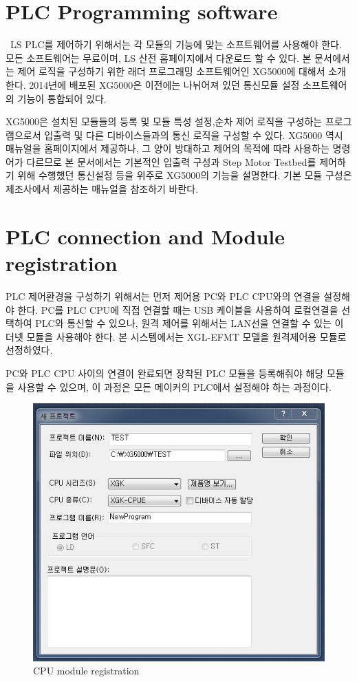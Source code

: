 \documentclass[11pt
  , a4paper
  , article
  , oneside
]{memoir}
\begin{document}
\newpage

 \section{PLC Programming software}\
LS PLC를 제어하기 위해서는 각 모듈의 기능에 맞는 소프트웨어를 사용해야 한다. 모든 소프트웨어는 무료이며, LS 산전 홈페이지에서 다운로드 할 수 있다. 본 문서에서는 제어 로직을 구성하기 위한 래더 프로그래밍 소프트웨어인 XG5000에 대해서 소개한다. 2014년에 배포된 XG5000은 이전에는 나뉘어져 있던 통신모듈 설정 소프트웨어의 기능이 통합되어 있다.  

XG5000은 설치된 모듈들의 등록 및 모듈 특성 설정,순차 제어 로직을 구성하는 프로그램으로서 입출력 및 다른 디바이스들과의 통신 로직을 구성할 수 있다. XG5000 역시 매뉴얼을 홈페이지에서 제공하나, 그 양이 방대하고 제어의 목적에 따라 사용하는 명령어가 다르므로 본 문서에서는 기본적인 입출력 구성과 Step Motor Testbed를 제어하기 위해 수행했던 통신설정 등을 위주로 XG5000의 기능을 설명한다. 기본 모듈 구성은 제조사에서 제공하는 매뉴얼을 참조하기 바란다. 
  
  \section{PLC connection and Module registration}
 PLC 제어환경을 구성하기 위해서는 먼저 제어용 PC와 PLC CPU와의 연결을 설정해야 한다. PC를 PLC CPU에 직접 연결할 때는 USB 케이블을 사용하여 로컬연결을 선택하여 PLC와 통신할 수 있으나, 원격 제어를 위해서는 LAN선을 연결할 수 있는 이더넷 모듈을 사용해야 한다. 본 시스템에서는 XGL-EFMT 모델을 원격제어용 모듈로 선정하였다.\
 
 PC와 PLC CPU 사이의 연결이 완료되면 장착된 PLC 모듈을 등록해줘야 해당 모듈을 사용할 수 있으며, 이 과정은 모든 메이커의 PLC에서 설정해야 하는 과정이다.
 
 \begin{figure}[h]
 	\centering
 	\includegraphics[width=0.6 \textwidth]{./picture/new_project.JPG}
 	\caption{
 		CPU module registration
 	}
 	\label{fig:}
 \end{figure}
 
\end{document}
